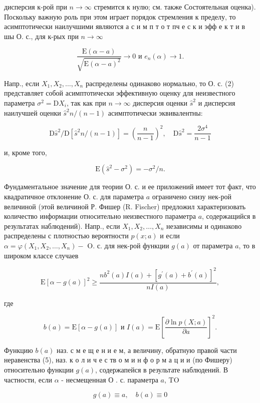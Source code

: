 \documentclass[10pt]{article}
\begin{document}
дисперсия к-рой при $n \rightarrow \infty$ стремится к нулю; см. также Состоятельная оценка). Поскольку важную роль при этом играет порядок стремления к пределу, то асимптотически наилучшими являются а с и м п т о т пч е с к и эфф е к т и в шы О. с., для к-рых при $n \rightarrow \infty$

\[
\frac{\mathrm{E}(\alpha-a)}{\sqrt{\mathrm{E}(\alpha-a)^{2}}} \longrightarrow 0 \text { и } e_{n}(\alpha) \longrightarrow 1 .
\]

Напр., если $X_{1}, X_{2}, \ldots, X_{n}$ распределены одинаково нормально, то О. с. (2) представляет собой асимптотически эффективную оценку для неизвестного параметра $\sigma^{2}=\mathrm{D} X_{i}$, так как при $n \rightarrow \infty$ дисперсия оценки $\hat{s}^{2}$ и дисперсия наилучшей оценки $\hat{s}^{2} n /(n-1)$ асимптотически эквивалентны:

\[
\mathrm{D} \hat{s}^{2} / \mathrm{D}\left[\hat{s}^{2} n /(n-1)\right]=\left(\frac{n}{n-1}\right)^{2}, \quad \mathrm{D} \hat{s}^{2}=\frac{2 \sigma^{4}}{n-1}
\]

и, кроме того,

\[
\mathrm{E}\left(\hat{s}^{2}-\sigma^{2}\right)=-\sigma^{2} / n .
\]

Фундаментальное значение для теории О. с. и ее приложений имеет тот факт, что квадратичное отклонение О. с. для параметра $a$ ограничено снизу нек-рой величиной (этой величиной Р. Фишер (R. Fischer) предложил характеризовать количество информации относительно неизвестного параметра $a$, содержащийся в результатах наблюдений). Напр., если $X_{1}, X_{2}, \ldots, X_{n}$ независимы и одинаково распределены с плотностью вероятности $p(x ; a)$ и если $\alpha=\varphi\left(X_{1}, X_{2}, \ldots, X_{n}\right)-$ O. с. для нек-рой функции $g(a)$ от параметра $a$, то в широком классе случаев

\[
\mathrm{E}[\alpha-g(a)]^{2} \geqslant \frac{n b^{2}(a) I(a)+\left[g^{\prime}(a)+b^{\prime}(a)\right]^{2}}{n I(a)},
\]

где

\[
b(a)=\mathrm{E}[\alpha-g(a)] \text { и } I(a)=\mathrm{E}\left[\frac{\partial \ln p(X ; a)}{\partial a}\right]^{2} .
\]

Функцию $b(a)$ наз. с м е щ е н и е м, а величину, обратную правой части неравенства (5), наз. к о л и ч е с тв о м и н ф о р м а ц и и (по Фишеру) относительно функции $g(a)$, содержапейся в результате наблюдений. В частности, если $\alpha$ - несмещенная О . с. параметра $a$, TO

\[
g(a) \equiv a, \quad b(a) \equiv 0
\]
\end{document}
